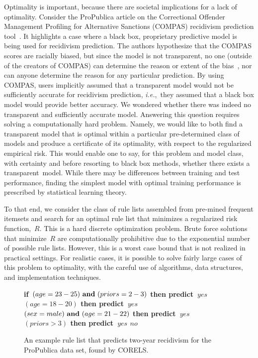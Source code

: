 \documentclass[twoside,11pt]{article}
\def\ie{{\it i.e.},~}
\def\bif{\bf if~}
\def\belif{{\bf else if~}}
\def\bthen{{\bf then predict~}}
\def\belse{{\bf else predict~}}
\def \band{{\bf ~and~}}
\begin{document}
Optimality is important, because there are societal implications for a lack of optimality.
%
Consider the ProPublica article on the Correctional Offender Management Profiling for Alternative Sanctions
(COMPAS) recidivism prediction tool~\citep{LarsonMaKiAn16}.
%
It highlights a case where a black box, proprietary predictive model is being used for recidivism prediction.
%
The authors hypothesize that the COMPAS scores are racially biased,
but since the model is not transparent, no one (outside of the creators of COMPAS)
can determine the reason or extent of the bias~\citep{LarsonMaKiAn16},
nor can anyone determine the reason for any particular prediction.
%
By using COMPAS, users implicitly assumed that a transparent model
would not be sufficiently accurate for recidivism prediction,
\ie they assumed that a black box model would provide better accuracy.
%
We wondered whether there was indeed no transparent and sufficiently accurate model.
%
Answering this question requires solving a computationally hard problem.
%
Namely, we would like to both find a transparent model that is optimal
within a particular pre-determined class of models
and produce a certificate of its optimality, with respect to the regularized empirical risk.
%
This would enable one to say, for this problem and model class,
with certainty and before resorting to black box methods,
whether there exists a transparent~model.
%
While there may be differences between training and test performance,
finding the simplest model with optimal training performance is prescribed by
statistical learning theory.

To that end, we consider the class of rule lists assembled from pre-mined frequent itemsets
and search for an optimal rule list that minimizes a regularized risk function,~$R$.
%
This is a hard discrete optimization problem.
%
Brute force solutions that minimize~$R$ are computationally prohibitive
due to the exponential number of possible rule lists.
%
However, this is a worst case bound that is not realized in practical settings.
%
For realistic cases, it is possible to solve fairly large cases of this problem to optimality,
with the careful use of algorithms, data structures, and implementation techniques.

\begin{kdd}
\begin{figure}[b!]
\vspace{-3mm}
\begin{algorithmic}
\normalsize
\State \bif $(age=23-25) \band (priors=2-3)$ \bthen $yes$
\State \belif $(age=18-20)$ \bthen $yes$
\State \belif $(sex=male) \band (age=21-22)$ \bthen $yes$
\State \belif $(priors>3)$ \bthen $yes$
\State \belse $no$
\end{algorithmic}
\vspace{-3mm}
\caption{An example rule list that predicts two-year recidivism
for the ProPublica data set, found by CORELS.
}
\label{fig:rule-list}
\end{figure}
\end{kdd}
\end{document}
